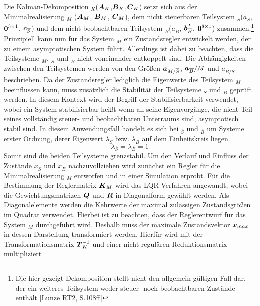 Die Kalman-Dekomposition $_K$($\boldsymbol{A}_K$,$\boldsymbol{B}_K$,$\boldsymbol{C}_K$) setzt sich aus der Minimalrealisierung $_M$ ($\boldsymbol{A}_M$, $\boldsymbol{B}_M$, $\boldsymbol{C}_M$), dem nicht steuerbaren Teilsystem $_{\overline{S}}$($a_{\overline{S}}$, $\boldsymbol{0}^{3\times 1}$, $\boldsymbol{c}_{\overline{S}}$) und dem nicht beobachtbaren Teilsystem $_{\overline{B}}$($a_{\overline{B}}$, $\boldsymbol{b}^T_{\overline{B}}$, $\boldsymbol{0}^{8\times 1}$) zusammen.\footnote{Die hier gezeigt Dekomposition stellt nicht den allgemein gültigen Fall dar, der ein weiteres Teilsystem weder steuer- noch beobachtbaren Zustände enthält [Lunze RT2, S.108ff]} Prinzipiell kann nun für das System $_M$ ein Zustandsregler entwickelt werden, der zu einem asymptotischen System führt. Allerdings ist dabei zu beachten, dass die Teilsysteme $_M$, $_{\overline{S}}$ und $_{\overline{B}}$ nicht voneinander entkoppelt sind. Die Abhängigkeiten zwischen den Teilsystemen werden von den Größen $\boldsymbol{a}_{M/\overline{S}}$, $\boldsymbol{a}_{\overline{B}}/M$ und $a_{\overline{B}/\overline{S}}$ beschrieben. Da der Zustandsregler lediglich die Eigenwerte des Teilsystem $_M$ beeinflussen kann, muss zusätzlich die Stabilität der Teilsysteme $_{\overline{S}}$ und $_{\overline{B}}$ geprüft werden. In diesem Kontext wird der Begriff der Stabilisierbarkeit verwendet, wobei ein System stabilisierbar heißt wenn all seine Eigenvorgänge, die nicht Teil seines vollständig steuer- und beobachtbaren Unterraums sind, asymptotisch stabil sind. In diesem Anwendungsfall handelt es sich bei $_{\overline{S}}$ und $_{\overline{B}}$ um Systeme erster Ordnung, derer Eigenwert $\lambda_{\overline{S}}$ bzw. $\lambda_{\overline{B}}$ auf dem Einheitskreis liegen.
\begin{equation}
\lambda_{\overline{S}} = \lambda_{\overline{B}} = 1
\end{equation}
Somit sind die beiden Teilsysteme grenzstabil. Um den Verlauf und Einfluss der Zustände $x_{\overline{S}}$ und $x_{\overline{B}}$ nachzuvollziehen wird zunächst ein Regler für die Minimalrealisierung $_M$ entworfen und in einer Simulation erprobt. Für die Bestimmung der Reglermatrix $\boldsymbol{K}_M$ wird das LQR-Verfahren angewandt, wobei die Gewichtungsmatrizen $\boldsymbol{Q}$ und $\boldsymbol{R}$ in Diagonalform gewählt werden. Als Diagonalelemente werden die Kehrwerte der maximal zulässigen Zustandsgrößen im Quadrat verwendet. Hierbei ist zu beachten, dass der Reglerentwurf für das System $_M$ durchgeführt wird. Deshalb muss der maximale Zustandsvektor $\boldsymbol{x}_{max}$ in dessen Darstellung transformiert werden. Hierfür wird mit der Transformationsmatrix $\boldsymbol{T}^{-1}_K$ und einer nicht regulären Reduktionsmatrix multipliziert
